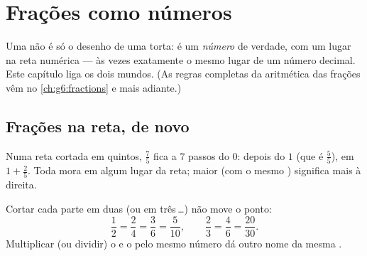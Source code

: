 \chapter{Frações como números}\label{ch:g5:fractions}

Uma  não é só o desenho de uma torta: é um \emph{número} de
verdade, com um lugar na reta numérica --- às vezes exatamente o
mesmo lugar de um número decimal. Este capítulo liga os dois mundos.
(As regras completas da aritmética das frações vêm no
\cref{ch:g6:fractions} e mais adiante.)

\section{Frações na reta, de novo}

\begin{example}\label{ex:g5:fractions:place}
Numa reta cortada em quintos, $\frac{7}{5}$ fica a $7$ passos do $0$:
depois do $1$ (que é $\frac55$), em $1 + \frac25$. Toda  mora
em algum lugar da reta;  maior (com o mesmo )
significa mais à direita.
\end{example}

\begin{proposition}\label{prop:g5:fractions:equal}
Cortar cada parte em duas (ou em três\,\dots) não move o ponto:
\[
\frac{1}{2} = \frac{2}{4} = \frac{3}{6} = \frac{5}{10},
\qquad
\frac{2}{3} = \frac{4}{6} = \frac{20}{30}.
\]
Multiplicar (ou dividir) o  e o  pelo mesmo
número dá outro nome da mesma .
\end{proposition}
\admitted

